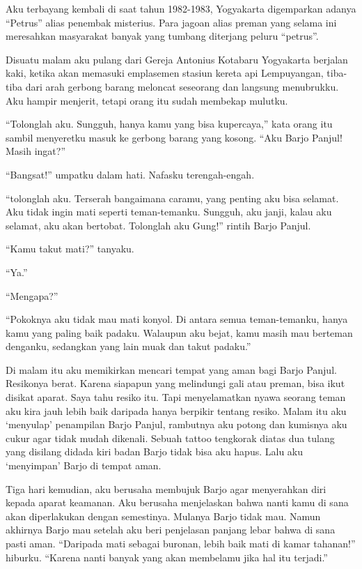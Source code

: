 	Aku terbayang kembali di saat tahun 1982-1983, Yogyakarta digemparkan adanya ``Petrus'' alias penembak misterius. Para jagoan alias preman yang selama ini meresahkan masyarakat banyak yang tumbang diterjang peluru ``petrus''.

	Disuatu malam aku pulang dari Gereja Antonius Kotabaru Yogyakarta berjalan kaki, ketika akan memasuki emplasemen stasiun kereta api Lempuyangan, tiba-tiba dari arah gerbong barang meloncat seseorang dan langsung menubrukku. Aku hampir menjerit, tetapi orang itu sudah membekap mulutku.

``Tolonglah aku. Sungguh, hanya kamu yang bisa kupercaya,'' kata orang itu sambil menyeretku masuk ke gerbong barang yang kosong. ``Aku Barjo Panjul! Masih ingat?''

``Bangsat!'' umpatku dalam hati. Nafasku terengah-engah.

``tolonglah aku. Terserah bangaimana caramu, yang penting aku bisa selamat. Aku tidak ingin mati seperti teman-temanku. Sungguh, aku janji, kalau aku selamat, aku akan bertobat. Tolonglah aku Gung!'' rintih Barjo Panjul.

``Kamu takut mati?'' tanyaku.

``Ya.'' 

``Mengapa?''

``Pokoknya aku tidak mau mati konyol. Di antara semua teman-temanku, hanya kamu yang paling baik padaku. Walaupun aku bejat, kamu masih mau berteman denganku, sedangkan yang lain muak dan takut padaku.''  

Di malam itu aku memikirkan mencari tempat yang aman bagi Barjo Panjul. Resikonya berat. Karena siapapun yang melindungi gali atau preman, bisa ikut disikat aparat. Saya tahu resiko itu. Tapi menyelamatkan nyawa seorang teman aku kira jauh lebih baik daripada hanya berpikir tentang resiko. Malam itu aku `menyulap' penampilan Barjo Panjul, rambutnya aku potong dan kumisnya aku cukur agar tidak mudah dikenali. Sebuah tattoo tengkorak diatas dua tulang yang disilang didada kiri badan Barjo tidak bisa aku hapus. Lalu aku `menyimpan'  Barjo di tempat aman.

Tiga hari kemudian, aku berusaha membujuk Barjo agar menyerahkan diri kepada aparat keamanan. Aku berusaha menjelaskan bahwa nanti kamu di sana akan diperlakukan dengan semestinya. Mulanya Barjo tidak mau. Namun akhirnya Barjo mau setelah aku beri penjelasan panjang lebar bahwa di sana pasti aman. ``Daripada mati sebagai buronan, lebih baik mati di kamar tahanan!'' hiburku. ``Karena nanti banyak yang akan membelamu jika hal itu terjadi.'' 

